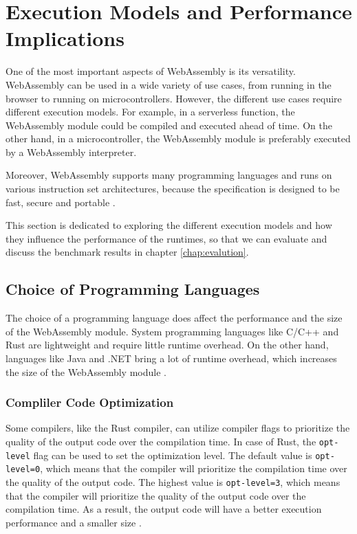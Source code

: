 \section{Execution Models and Performance Implications}
\label{sec:execution-models-and-performance-implications}

One of the most important aspects of WebAssembly is its versatility. WebAssembly can be used in a wide variety of use cases, from running in the browser to running on microcontrollers. However, the different use cases require different execution models. For example, in a serverless function, the WebAssembly module could be compiled and executed ahead of time. On the other hand, in a microcontroller, the WebAssembly module is preferably executed by a WebAssembly interpreter. 

Moreover, \gls{WebAssembly} supports many programming languages and runs on various instruction set architectures, because the specification is designed to be fast, secure and portable \cite{butcher_2023_the}. 

This section is dedicated to exploring the different execution models and how they influence the performance of the runtimes, so that we can evaluate and discuss the benchmark results in chapter \ref{chap:evalution}.

\subsection{Choice of Programming Languages}
\label{sec:programming-languages}

The choice of a programming language does affect the performance and the size of the WebAssembly module. System programming languages like C/C++ and Rust are lightweight and require little runtime overhead. On the other hand, languages like Java and .NET bring a lot of runtime overhead, which increases the size of the WebAssembly module \cite{butcher_2023_the}. %

\subsubsection{Compliler Code Optimization}
\label{sec:compliler-code-optimization}

Some compilers, like the Rust compiler, can utilize compiler flags to prioritize the quality of the output code over the compilation time. In case of Rust, the \texttt{opt-level} flag can be used to set the optimization level. The default value is \texttt{opt-level=0}, which means that the compiler will prioritize the compilation time over the quality of the output code. The highest value is \texttt{opt-level=3}, which means that the compiler will prioritize the quality of the output code over the compilation time. As a result, the output code will have a better execution performance and a smaller size \cite{rustlangcommunity_2021_customizing}. 

